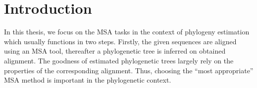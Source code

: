 \section{Introduction}
\label{sec:introducntion}
%
%
In this thesis, we focus on the MSA tasks in the context of phylogeny estimation which usually functions in two steps. Firstly, the given sequences are aligned using an MSA tool, thereafter a phylogenetic tree is inferred on obtained alignment. The goodness of estimated phylogenetic trees largely rely on the properties of the corresponding alignment. Thus, choosing the ``most appropriate'' MSA method  is important in the phylogenetic context.

